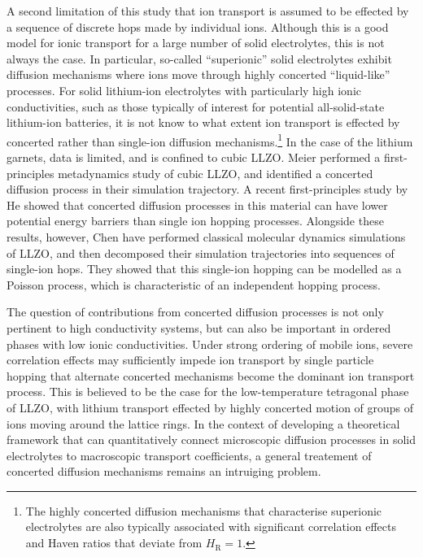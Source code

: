 \documentclass[aps,prb,twocolumn,superscriptaddress,reprint]{revtex4-1}
\begin{document}
A second limitation of this study that ion transport is assumed to be effected by a sequence of discrete hops made by individual ions. Although this is a good model for ionic transport for a large number of solid electrolytes, this is not always the case. In particular, so-called ``superionic'' solid electrolytes exhibit diffusion mechanisms where ions move through highly concerted ``liquid-like'' processes.\cite{Catlow_AnnRevMaterSci1986,Hull_RepProgPhys2004} For solid lithium-ion electrolytes with particularly high ionic conductivities, such as those typically of interest for potential all-solid-state lithium-ion batteries, it is not know to what extent ion transport is effected by concerted rather than single-ion diffusion mechanisms.\footnote{The highly concerted diffusion mechanisms that characterise superionic electrolytes are also typically associated with significant correlation effects and Haven ratios that deviate from $H_\mathrm{R}=1$.\cite{SalanneEtAl_JPhysChemC2012,Hull_RepProgPhys2004}} In the case of the lithium garnets, data is limited, and is confined to cubic LLZO. Meier \etal performed a first-principles metadynamics study of cubic LLZO, and identified a concerted diffusion process in their simulation trajectory.\cite{MeierEtAl_JPhysChemC2014} A recent first-principles study by He \etal showed that concerted diffusion processes in this material can have lower potential energy barriers than single ion hopping processes. Alongside these results, however, Chen \etal have performed classical molecular dynamics simulations of LLZO, and then decomposed their simulation trajectories into sequences of single-ion hops.\cite{ChenEtAl_SciRep2017} They showed that this single-ion hopping can be modelled as a Poisson process, which is characteristic of an independent hopping process.\cite{MorganAndMadden_PhysRevLett2014}

The question of contributions from concerted diffusion processes is not only pertinent to high conductivity systems, but can also be important in ordered phases with low ionic conductivities.\cite{MorganAndMadden_AgIDiffusionInSubmission} Under strong ordering of mobile ions, severe correlation effects may sufficiently impede ion transport by single particle hopping that alternate concerted mechanisms become the dominant ion transport process. This is believed to be the case for the low-temperature tetragonal phase of LLZO, with lithium transport effected by highly concerted motion of groups of ions moving around the lattice rings. \cite{BurbanoEtAl_PhysRevLett2016} In the context of developing a theoretical framework that can quantitatively connect microscopic diffusion processes in solid electrolytes to macroscopic transport coefficients, a general treatement of concerted diffusion mechanisms remains an intruiging problem. 
\end{document}
